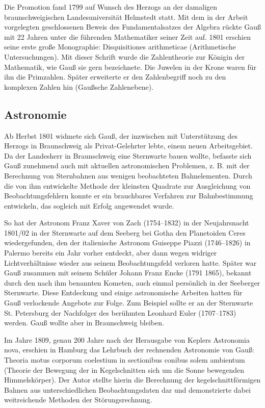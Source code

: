 \documentclass[10pt]{article}
\begin{document}
Die Promotion fand 1799 auf Wunsch des Herzogs an der damaligen
braunschweigischen Landesuniversität Helmstedt statt. Mit dem in der Arbeit
vorgelegten geschlossenen Beweis des Fundamentalsatzes der Algebra rückte Gauß
mit 22 Jahren unter die führenden Mathematiker seiner Zeit auf. 1801 erschien
seine erste große Monographie: {\glqq}Disquisitiones arithmeticae{\grqq}
(Arithmetische Untersuchungen). Mit dieser Schrift wurde die Zahlentheorie zur
{\glqq}Königin der Mathematik{\grqq}, wie Gauß sie gern bezeichnete. Die
Juwelen in der Krone waren für ihn die Primzahlen. Später erweiterte er den
Zahlenbegriff noch zu den komplexen Zahlen hin (Gaußsche Zahlenebene).

\subsection{Astronomie}

Ab Herbst 1801 widmete sich Gauß, der inzwischen mit Unterstützung des Herzogs
in Braunschweig als Privat-Gelehrter lebte, einem neuen Arbeitsgebiet. Da der
Landesherr in Braunschweig eine Sternwarte bauen wollte, befasste sich Gauß
zunehmend auch mit aktuellen astronomischen Problemen, z. B. mit der
Berechnung von Sternbahnen aus wenigen beobachteten Bahnelementen. Durch die
von ihm entwickelte Methode der kleinsten Quadrate zur Ausgleichung von
Beobachtungsfehlern konnte er ein brauchbares Verfahren zur Bahnbestimmung
entwickeln, das sogleich mit Erfolg angewendet wurde.

So hat der Astronom Franz Xaver von Zach (1754--1832) in der Neujahrsnacht
1801/02 in der Sternwarte auf dem Seeberg bei Gotha den Planetoiden Ceres
wiedergefunden, den der italienische Astronom Guiseppe Piazzi (1746--1826) in
Palermo bereits ein Jahr vorher entdeckt, aber dann wegen widriger
Lichtverhältnisse wieder aus seinem Beobachtungsfeld verloren hatte. Später
war Gauß zusammen mit seinem Schüler Johann Franz Encke (1791 1865), bekannt
durch den nach ihm benannten Kometen, auch einmal persönlich in der Seeberger
Sternwarte. Diese Entdeckung und einige astronomische Arbeiten hatten für Gauß
verlockende Angebote zur Folge. Zum Beispiel sollte er an der Sternwarte
St. Petersburg der Nachfolger des berühmten Leonhard Euler (1707--1783)
werden. Gauß wollte aber in Braunschweig bleiben.

Im Jahre 1809, genau 200 Jahre nach der Herausgabe von Keplers
{\glqq}Astronomia nova{\grqq}, erschien in Hamburg das Lehrbuch der rechnenden
Astronomie von Gauß: {\glqq}Theoria motus corporum coelestium in sectionibus
conibus solem ambientum{\grqq} (Theorie der Bewegung der in Kegelschnitten
sich um die Sonne bewegenden Himmelskörper). Der Autor stellte hierin die
Berechnung der kegelschnittförmigen Bahnen aus unterschiedlichen
Beobachtungsdaten dar und demonstrierte dabei weitreichende Methoden der
Störungsrechnung.
\end{document}
